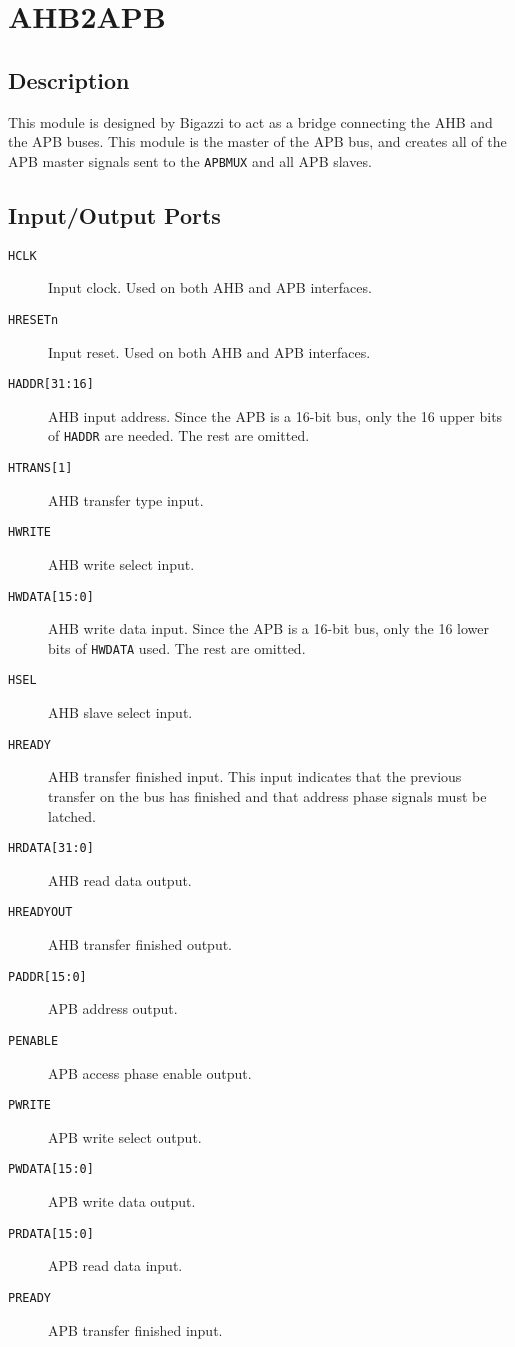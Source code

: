 \section{AHB2APB}
\subsection{Description}
This module is designed by Bigazzi to act as a bridge connecting the AHB and the APB buses. This module is the master of the APB bus, and creates all of the APB master signals sent to the \texttt{APBMUX} and all APB slaves.

\subsection{Input/Output Ports}
\begin{description}
	\item[\texttt{HCLK}] Input clock. Used on both AHB and APB interfaces.
	\item[\texttt{HRESETn}] Input reset. Used on both AHB and APB interfaces.
	\item[\texttt{HADDR[31:16]}] AHB input address. Since the APB is a 16-bit bus, only the 16 upper bits of \texttt{HADDR} are needed. The rest are omitted.
	\item[\texttt{HTRANS[1]}] AHB transfer type input.
	\item[\texttt{HWRITE}] AHB write select input.
	\item[\texttt{HWDATA[15:0]}] AHB write data input. Since the APB is a 16-bit bus, only the 16 lower bits of \texttt{HWDATA} used. The rest are omitted.
	\item[\texttt{HSEL}] AHB slave select input.
	\item[\texttt{HREADY}] AHB transfer finished input. This input indicates that the previous transfer on the bus has finished and that address phase signals must be latched.
	\item[\texttt{HRDATA[31:0]}] AHB read data output.
	\item[\texttt{HREADYOUT}] AHB transfer finished output.
	\item[\texttt{PADDR[15:0]}] APB address output.
	\item[\texttt{PENABLE}] APB access phase enable output.
	\item[\texttt{PWRITE}] APB write select output.
	\item[\texttt{PWDATA[15:0]}] APB write data output.
	\item[\texttt{PRDATA[15:0]}] APB read data input.
	\item[\texttt{PREADY}] APB transfer finished input.
\end{description}

